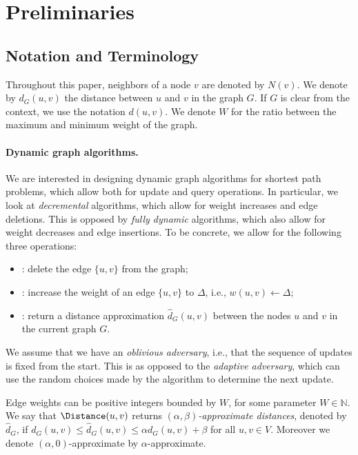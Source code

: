 \section{Preliminaries}
\subsection{Notation and Terminology}\label{sc:notation}
Throughout this paper, neighbors of a node $v$ are denoted by $N(v)$. We denote by $d_G(u,v)$ the distance between $u$ and $v$ in the graph $G$. If $G$ is clear from the context, we use the notation $d(u,v)$. We denote $W$ for the ratio between the maximum and minimum weight of the graph.  

\paragraph{Dynamic graph algorithms.}
We are interested in designing dynamic graph algorithms for shortest path problems, which allow both for update and query operations. In particular, we look at \emph{decremental} algorithms, which allow for weight increases and edge deletions. This is opposed by \emph{fully dynamic} algorithms, which also allow for weight decreases and edge insertions. To be concrete, we allow for the following three operations:
\begin{itemize}
    \item {}: delete the edge $\{u,v\}$ from the graph;
    \item {}: increase the weight of an edge $\{u,v\}$ to $\Delta$, i.e., $w(u,v)\leftarrow \Delta $;
    \item {}: return a distance approximation $\hat d_G(u,v)$ between the nodes $u$ and $v$ in the current graph $G$.
\end{itemize}

We assume that we have an \emph{oblivious adversary}, i.e., that the sequence of updates is fixed from the start. This is as opposed to the \emph{adaptive adversary}, which can use the random choices made by the algorithm to determine the next update. 

Edge weights can be positive integers bounded by $W$, for some parameter $W\in \mathbb N$. We say that $\Distance(u,v)$ returns \emph{$(\alpha,\beta)$-approximate distances}, denoted by $\hat d_G$, if $d_G(u,v) \leq \hat d_G(u,v) \leq \alpha d_G(u,v)+\beta$ for all $u,v\in V$. Moreover we denote $(\alpha,0)$-approximate by $\alpha$-approximate. 

